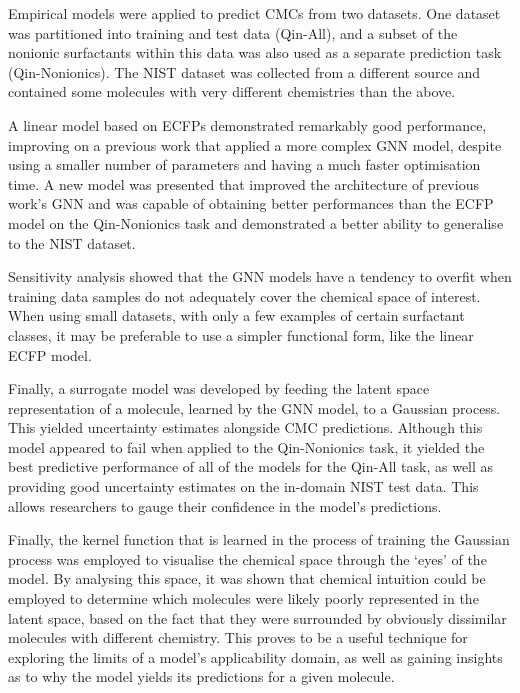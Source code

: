Empirical models were applied to predict CMCs from two datasets. One dataset was partitioned into training and test data (Qin-All), and a subset of the nonionic surfactants within this data was also used as a separate prediction task
(Qin-Nonionics). The NIST dataset was collected from a different source and contained some molecules with very different chemistries than the above.

A linear model based on ECFPs demonstrated remarkably good performance, improving on a previous work \cite{qinPredictingCriticalMicelle2021} that applied a more complex GNN model, despite using a smaller number of parameters and having a much faster optimisation time. A new model was presented that improved the architecture of previous work's GNN and was capable of obtaining better performances than the ECFP model on the Qin-Nonionics task and
demonstrated a better ability to generalise to the NIST dataset.

Sensitivity analysis showed that the GNN models have a tendency to overfit when
training data samples do not adequately cover the chemical space of interest.
When using small datasets, with only a few examples of certain surfactant
classes, it may be preferable to use a simpler functional form, like the linear
ECFP model.

Finally, a surrogate model was developed by feeding the latent space representation of a molecule, learned by the GNN model, to a Gaussian process.
This yielded uncertainty estimates alongside CMC predictions. Although this model appeared to fail when applied to the Qin-Nonionics task, it yielded the best predictive performance of all of the models for the Qin-All task, as well as
providing good uncertainty estimates on the in-domain NIST test data.
This allows researchers to gauge their confidence in the model's predictions.

Finally, the kernel function that is learned in the process of training the
Gaussian process was employed to visualise the chemical space through the `eyes'
of the model. By analysing this space, it was shown that chemical intuition
could be employed to determine which molecules were likely poorly represented in
the latent space, based on the fact that they were surrounded by obviously
dissimilar molecules with different chemistry. This proves to be a useful technique
for exploring the limits of a model's applicability domain, as well as gaining insights
as to why the model yields its predictions for a given molecule.